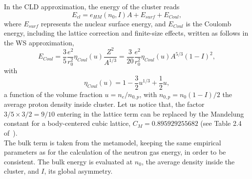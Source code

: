 In the CLD approximation, the energy of the cluster reads
%
\begin{equation}
  E_{cl} = e_{HM}(n_0, I)A + E_{surf} + E_{Coul},
\end{equation}
%
where $E_{surf}$ represents the nuclear surface energy, and $E_{Coul}$ is the Coulomb
energy, including the lattice correction and finite-size effects, written 
as follows in the WS approximation,
%
\begin{equation}
  E_{Coul} = \frac{3}{5}\frac{e^2}{r_0^2}\eta_{Coul}(u)\frac{Z^2}{A^{1/3}} =
  \frac{3}{20}\frac{e^2}{r_0^2}\eta_{Coul}(u)A^{5/3}(1-I)^2,\label{eq:ecoul}
\end{equation}
%
with
%
\begin{equation}
  \eta_{Coul}(u) = 1-\frac{3}{2}u^{1/3} + \frac{1}{2}u,\label{eq:fcoul}
\end{equation}
%
a function of the volume fraction $u = n_e/n_{0,p}$, with $n_{0,p} =
n_0(1-I)/2$ the average proton density inside cluster. Let us notice that, 
the factor $3/5 \times 3/2 = 9/10$ entering in the lattice term can be
replaced by the Mandelung constant for a body-centered cubic lattice, $C_M =
0.895929255682$ (see Table 2.4 of~\cite{Haensel2007}).\\
The bulk term is taken from the metamodel, keeping the same empirical parameters
as for the calculation of the neutron gas energy, in order to be consistent. 
The bulk energy is evaluated at $n_0$, the average density inside the cluster, 
and $I$, its global asymmetry.

